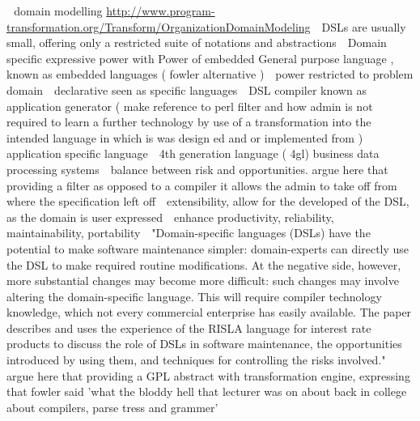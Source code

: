 \newline 
domain modelling
\url{http://www.program-transformation.org/Transform/OrganizationDomainModeling}
\newline 
DSLs are usually small, offering only a restricted suite of
notations and abstractions
\newline 
Domain specific expressive power with Power of embedded General purpose language , known as embedded languages ( fowler alternative )
\newline 
power restricted to problem domain
\newline 
declarative seen as specific languages
\newline 
DSL compiler known as application generator ( make reference to perl filter and how admin is not required to learn a further technology by use of a transformation into the intended language in which is was design ed and or implemented from )
\newline 
application specific language
\newline 
4th generation language ( 4gl) business data processing systems
\newline 
balance between risk and opportunities. 
argue here that providing a filter as opposed to a compiler it allows the admin to take off from where the specification left off
\newline 
extensibility, allow for the developed of the DSL, as the domain is user expressed
\newline 
enhance productivity, reliability, maintainability, portability
\newline 
"Domain-specific languages (DSLs) have the potential
to make software maintenance simpler: domain-experts
can directly use the DSL to make required routine modifications.
At the negative side, however, more substantial
changes may become more difficult: such changes
may involve altering the domain-specific language. This
will require compiler technology knowledge, which not
every commercial enterprise has easily available. The
paper describes and uses the experience of the RISLA
language for interest rate products to discuss the role of
DSLs in software maintenance, the opportunities introduced
by using them, and techniques for controlling the
risks involved."
\newline 
argue here that providing a GPL abstract with  transformation engine, expressing that fowler said 'what the bloddy hell that lecturer was on about back in college about compilers, parse tress and grammer'
\newline 
